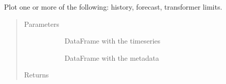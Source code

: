 \documentclass[letterpaper,10pt,english]{sphinxmanual}
\begin{document}
\begin{fulllineitems}
\label{\detokenize{autoapi/src/plot/altair/index:src.plot.altair.plot_base}}
Plot one or more of the following: history, forecast, transformer limits.
\begin{quote}\begin{description}
\item[{Parameters}] \leavevmode\begin{description}
\item[{}] \leavevmode{[}\sphinxcode{\sphinxupquote{pd.DataFrame}}{]}
DataFrame with the timeseries

\item[{}] \leavevmode{[}\sphinxcode{\sphinxupquote{pd.DataFrame}}{]}
DataFrame with the metadata

\end{description}

\item[{Returns}] \leavevmode\begin{description}
\item[{  }] \leavevmode
\end{description}

\end{description}\end{quote}

\end{fulllineitems}

\end{document}
